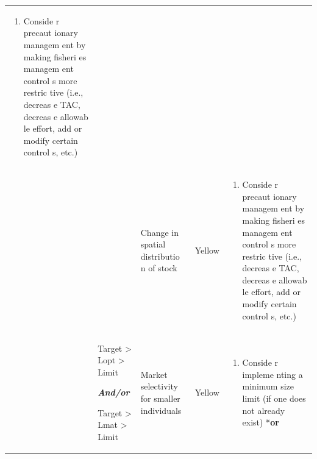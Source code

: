 \documentclass[]{book}
\providecommand{\tightlist}{%
  \setlength{\itemsep}{0pt}\setlength{\parskip}{0pt}}
\begin{document}
\begin{longtable}[]{@{}lllll@{}}
\begin{minipage}[t]{0.19\columnwidth}
\begin{enumerate}
\def\labelenumi{\arabic{enumi}.}
\tightlist
\item
  Conside r precaut ionary managem ent by making fisheri es managem ent
  control s more restric tive (i.e., decreas e TAC, decreas e allowab le
  effort, add or modify certain control s, etc.)
\end{enumerate}\strut
\end{minipage}\tabularnewline
\begin{minipage}[t]{0.19\columnwidth}\raggedright\strut
\strut
\end{minipage} & \begin{minipage}[t]{0.19\columnwidth}\raggedright\strut
\strut
\end{minipage} & \begin{minipage}[t]{0.19\columnwidth}\raggedright\strut
Change in spatial distributio n of stock\strut
\end{minipage} & \begin{minipage}[t]{0.19\columnwidth}\raggedright\strut
Yellow\strut
\end{minipage} & \begin{minipage}[t]{0.19\columnwidth}\raggedright\strut
\begin{enumerate}
\def\labelenumi{\arabic{enumi}.}
\tightlist
\item
  Conside r precaut ionary managem ent by making fisheri es managem ent
  control s more restric tive (i.e., decreas e TAC, decreas e allowab le
  effort, add or modify certain control s, etc.)
\end{enumerate}\strut
\end{minipage}\tabularnewline
\begin{minipage}[t]{0.19\columnwidth}\raggedright\strut
\strut
\end{minipage} & \begin{minipage}[t]{0.19\columnwidth}\raggedright\strut
Target \textgreater{} Lopt \textgreater{} Limit

\emph{\textbf{And/or} }

Target \textgreater{} Lmat \textgreater{} Limit\strut
\end{minipage} & \begin{minipage}[t]{0.19\columnwidth}\raggedright\strut
Market selectivity for smaller individuals\strut
\end{minipage} & \begin{minipage}[t]{0.19\columnwidth}\raggedright\strut
Yellow\strut
\end{minipage} & \begin{minipage}[t]{0.19\columnwidth}\raggedright\strut
\begin{enumerate}
\def\labelenumi{\arabic{enumi}.}
\tightlist
\item
  Conside r impleme nting a minimum size limit (if one does not already
  exist) *\textbf{or}
\end{enumerate}


\end{minipage}
\end{longtable}
\end{document}
